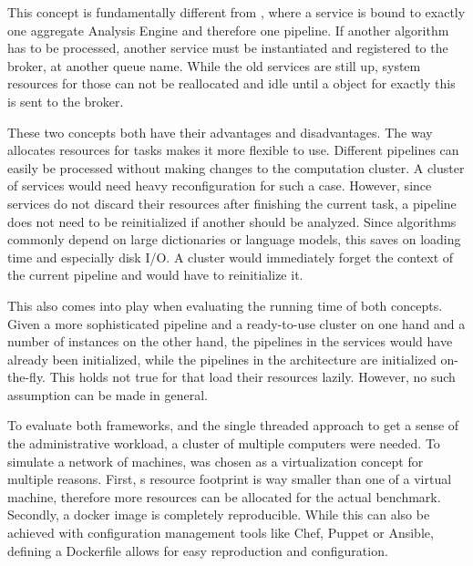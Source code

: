 This concept is fundamentally different from \uimaas{}, where a service is bound to exactly one aggregate Analysis Engine and therefore one pipeline. If another \nlp{} algorithm has to be processed, another \uimaas{} service must be instantiated and registered to the broker, at another queue name. While the old services are still up, system resources for those can not be reallocated and idle until a \cas{} object for exactly this \anen{} is sent to the broker. 

These two concepts both have their advantages and disadvantages. The way \spark{} allocates resources for tasks makes it more flexible to use. Different pipelines can easily be processed without making changes to the computation cluster. A cluster of \uimaas{} services would need heavy reconfiguration for such a case. However, since \uimaas{} services do not discard their resources after finishing the current task, a pipeline does not need to be reinitialized if another \cas{} should be analyzed. Since \nlp{} algorithms commonly depend on large dictionaries or language models, this saves on loading time and especially disk I/O. A \spark{} cluster would immediately forget the context of the current pipeline and would have to reinitialize it.

This also comes into play when evaluating the running time of both concepts. Given a more sophisticated pipeline and a ready-to-use \spark{} cluster on one hand and a number of \uimaas{} instances on the other hand, the pipelines in the \uimaas{} services would have already been initialized, while the pipelines in the \spark{} architecture are initialized on-the-fly. This holds not true for \anens{} that load their resources lazily. However, no such assumption can be made in general.

To evaluate both frameworks, and the single threaded approach to get a sense of the administrative workload, a cluster of multiple computers were needed. To simulate a network of machines, \docker{} was chosen as a virtualization concept for multiple reasons. First, \docker{}s resource footprint is way smaller than one of a virtual machine, therefore more resources can be allocated for the actual benchmark. Secondly, a docker image is completely reproducible. While this can also be achieved with configuration management tools like Chef, Puppet or Ansible, defining a Dockerfile allows for easy reproduction and configuration. 

